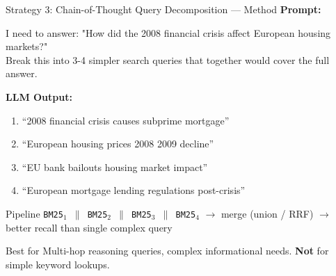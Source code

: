\documentclass[aspectratio=169]{beamer}
\newif\ifanimated
\newcommand{\cpause}{\ifanimated\pause\fi}
\begin{document}
\begin{frame}[shrink=30]{Strategy 3: Chain-of-Thought Query Decomposition --- Method}
\textbf{Prompt:}
\begin{tcolorbox}[colback=gray!10, colframe=gray!50, fontupper=\small\ttfamily]
I need to answer: "How did the 2008 financial crisis affect European housing markets?"\\
Break this into 3-4 simpler search queries that together would cover the full answer.
\end{tcolorbox}

\vspace{0.3em}

\textbf{LLM Output:}
\begin{enumerate}
    \item ``2008 financial crisis causes subprime mortgage''
    \item ``European housing prices 2008 2009 decline''
    \item ``EU bank bailouts housing market impact''
    \item ``European mortgage lending regulations post-crisis''
\end{enumerate}\cpause

\vspace{0.3em}

\begin{block}{Pipeline}
\texttt{BM25$_1$ $\parallel$ BM25$_2$ $\parallel$ BM25$_3$ $\parallel$ BM25$_4$} $\to$ merge (union / RRF) $\to$ better recall than single complex query
\end{block}

\vspace{0.3em}

\begin{exampleblock}{Best for}
Multi-hop reasoning queries, complex informational needs. \textbf{Not} for simple keyword lookups.
\end{exampleblock}
\end{frame}


\end{document}
